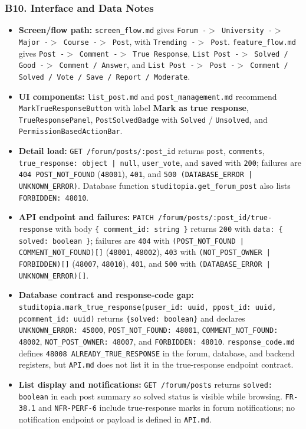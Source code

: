 \documentclass[12pt]{article}
\begin{document}
\hypertarget{sec:b10-interface-and-data-notes}{}
\subsubsection*{B10. Interface and Data Notes}
\par\medskip

\begin{itemize}
\item \textbf{Screen/flow path:} \texttt{screen\_flow.md} gives \texttt{Forum -$>$ University -$>$ Major -$>$ Course -$>$ Post}, with \texttt{Trending -$>$ Post}. \texttt{feature\_flow.md} gives \texttt{Post -$>$ Comment -$>$ True Response}, \texttt{List Post -$>$ Solved / Good -$>$ Comment / Answer}, and \texttt{List Post -$>$ Post -$>$ Comment / Solved / Vote / Save / Report / Moderate}.
\item \textbf{UI components:} \texttt{list\_post.md} and \texttt{post\_management.md} recommend \texttt{MarkTrueResponseButton} with label \textbf{Mark as true response}, \texttt{TrueResponsePanel}, \texttt{PostSolvedBadge} with \texttt{Solved} / \texttt{Unsolved}, and \texttt{PermissionBasedActionBar}.
\item \textbf{Detail load:} \texttt{GET /forum/posts/:post\_id} returns \texttt{post}, \texttt{comments}, \texttt{true\_response: object | null}, \texttt{user\_vote}, and \texttt{saved} with \texttt{200}; failures are \texttt{404 POST\_NOT\_FOUND} (\texttt{48001}), \texttt{401}, and \texttt{500 (DATABASE\_ERROR | UNKNOWN\_ERROR)}. Database function \texttt{studitopia.get\_forum\_post} also lists \texttt{FORBIDDEN: 48010}.
\item \textbf{API endpoint and failures:} \texttt{PATCH /forum/posts/:post\_id/true-response} with body \texttt{\{ comment\_id: string \}} returns \texttt{200} with \texttt{data: \{ solved: boolean \}}; failures are \texttt{404} with \texttt{(POST\_NOT\_FOUND | COMMENT\_NOT\_FOUND)[]} (\texttt{48001}, \texttt{48002}), \texttt{403} with \texttt{(NOT\_POST\_OWNER | FORBIDDEN)[]} (\texttt{48007}, \texttt{48010}), \texttt{401}, and \texttt{500} with \texttt{(DATABASE\_ERROR | UNKNOWN\_ERROR)[]}.
\item \textbf{Database contract and response-code gap:} \texttt{studitopia.mark\_true\_response(puser\_id: uuid, ppost\_id: uuid, pcomment\_id: uuid)} returns \texttt{\{solved: boolean\}} and declares \texttt{UNKNOWN\_ERROR: 45000}, \texttt{POST\_NOT\_FOUND: 48001}, \texttt{COMMENT\_NOT\_FOUND: 48002}, \texttt{NOT\_POST\_OWNER: 48007}, and \texttt{FORBIDDEN: 48010}. \texttt{response\_code.md} defines \texttt{48008 ALREADY\_TRUE\_RESPONSE} in the forum, database, and backend registers, but \texttt{API.md} does not list it in the true-response endpoint contract.
\item \textbf{List display and notifications:} \texttt{GET /forum/posts} returns \texttt{solved: boolean} in each post summary so solved status is visible while browsing. \texttt{FR-38.1} and \texttt{NFR-PERF-6} include true-response marks in forum notifications; no notification endpoint or payload is defined in \texttt{API.md}.
\end{itemize}
\par\medskip
\end{document}

